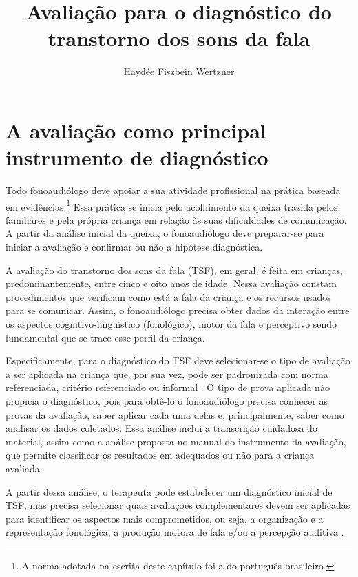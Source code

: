 \documentclass[output=paper,colorlinks,citecolor=brown,booklanguage=portuguese]{langscibook}
\title{Avaliação para o diagnóstico do transtorno dos sons da fala}
\author{Haydée Fiszbein Wertzner\affiliation{Universidade de São Paulo, Faculdade de Medicina, Laboratório de Investigação Fonoaudiológica em Fonologia (LIFFON)}}
\begin{document}
\maketitle

\section{A avaliação como principal instrumento de diagnóstico}\label{sec1cap3}

Todo fonoaudiólogo deve apoiar a sua atividade profissional na prática baseada em evidências.\footnote{A norma adotada na escrita deste capítulo foi a do português brasileiro.}
Essa prática se inicia pelo acolhimento da queixa trazida pelos familiares e pela própria criança em relação às suas dificuldades de comunicação. A partir da análise inicial da queixa, o fonoaudiólogo deve preparar-se para iniciar a avaliação e confirmar ou não a hipótese diagnóstica.

A avaliação do transtorno dos sons da fala (TSF), em geral, é feita em crianças, predominantemente, entre cinco e oito anos de idade. Nessa avaliação constam procedimentos que verificam como está a fala da criança e os recursos usados para se comunicar. Assim, o fonoaudiólogo precisa obter dados da interação entre os aspectos cognitivo-linguístico (fonológico), motor da fala e perceptivo sendo fundamental que se trace esse perfil da criança. 

Especificamente, para o diagnóstico do TSF deve selecionar-se o tipo de avaliação a ser aplicada na criança que, por sua vez, pode ser padronizada com norma referenciada, critério referenciado ou informal \citep{McLeodEtAl2017}. O tipo de prova aplicada não propicia o diagnóstico, pois para obtê-lo o fonoaudiólogo precisa conhecer as provas da avaliação, saber aplicar cada uma delas e, principalmente, saber como analisar os dados coletados. Essa análise inclui a transcrição cuidadosa do material, assim como a análise proposta no manual do instrumento da avaliação, que permite classificar os resultados em adequados ou não para a criança avaliada.

A partir dessa análise, o terapeuta pode estabelecer um diagnóstico inicial de TSF, mas precisa selecionar quais avaliações complementares devem ser aplicadas para identificar os aspectos mais comprometidos, ou seja, a organização e a representação fonológica, a produção motora de fala e/ou a percepção auditiva \citep{Wertzner2002}.
\end{document}
